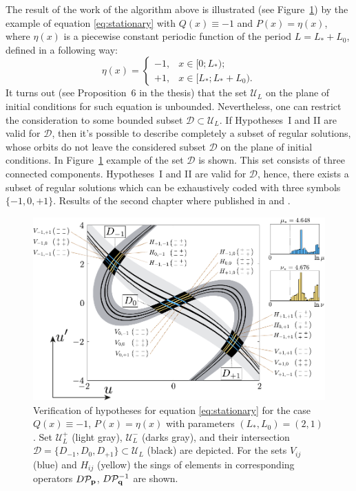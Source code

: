 \documentclass[candidate, href, colorlinks]{disser}
\begin{document}
The result of the work of the algorithm above is illustrated (see Figure~\ref{fig:hypotheses-validation}) by the example of equation \eqref{eq:stationary} with $Q(x) \equiv -1$ and $P(x) = \eta(x)$, where $\eta(x)$ is a piecewise constant periodic function of the period $L = L_* + L_0$, defined in a following way:
\begin{equation}
	\eta(x) = \left\{
		\begin{array}{rl}
			-1, & x \in [0; L_*); \\
			+1, & x \in [L_*; L_* + L_0).
		\end{array}
	\right.
\label{eq:eta}
\end{equation}
It turns out (see Proposition~6 in the thesis) that the set $\mathscr{U}_L$ on the plane of initial conditions for such equation is unbounded.
Nevertheless, one can restrict the consideration to some bounded subset $\mathcal{D} \subset \mathscr{U}_L$.
If Hypotheses~I and II are valid for $\mathcal{D}$, then it's possible to describe completely a subset of regular solutions, whose orbits do not leave the considered subset $\mathcal{D}$ on the plane of initial conditions.
In Figure~\ref{fig:hypotheses-validation} example of the set $\mathcal{D}$ is shown.
This set consists of three connected components.
Hypotheses~I and II are valid for $\mathcal{D}$, hence, there exists a subset of regular solutions which can be exhaustively coded with three symbols $\{-1, 0, +1\}$.
Results of the second chapter where published in \cite{Bannoe2019} and \cite{Bannoe2021}.

\begin{figure}[h]
\centering
	\includegraphics[scale = 1]{../pic/hypotheses for piecewise equation}
	\caption{
		Verification of hypotheses for equation \eqref{eq:stationary} for the case $Q(x) \equiv -1$, $P(x) = \eta(x)$ with parameters $(L_*, L_0) = (2, 1)$.
		Set $\mathscr{U}_L^+$ (light gray), $\mathscr{U}_L^-$ (darks gray), and their intersection $\mathcal{D} = \{ D_{-1}, D_0, D_{+1} \} \subset \mathscr{U}_L$ (black) are depicted.
		For the sets $V_{ij}$ (blue) and $H_{ij}$ (yellow) the sings of elements in corresponding operators $D \mathcal{P}_{\vb{p}}$, $D \mathcal{P}_{\vb{q}}^{-1}$ are shown.
	}
\label{fig:hypotheses-validation}
\end{figure}
\end{document}

